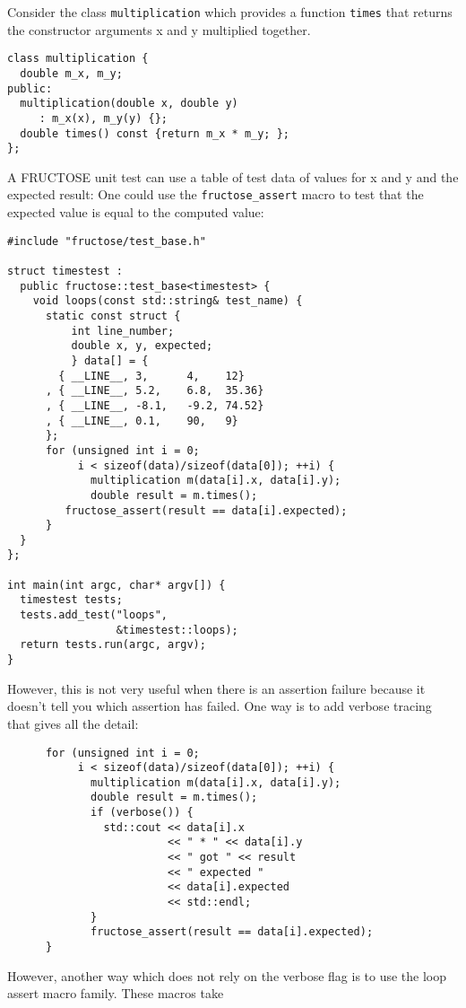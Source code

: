 \documentclass{book}
\begin{document}
Consider the class {\tt multiplication}
which provides a function {\tt times} that returns the constructor arguments
x and y multiplied together.
\begin{verbatim}
class multiplication {
  double m_x, m_y;
public:
  multiplication(double x, double y) 
     : m_x(x), m_y(y) {};
  double times() const {return m_x * m_y; };
};
\end{verbatim}
A FRUCTOSE unit test can use a table of test data of
values for x and y and the expected result:
One could use the {\tt fructose\_assert} macro to test
that the expected value is equal to the computed value:
\begin{verbatim}
#include "fructose/test_base.h"

struct timestest : 
  public fructose::test_base<timestest> {
    void loops(const std::string& test_name) {
      static const struct {
          int line_number;
          double x, y, expected;
          } data[] = {
        { __LINE__, 3,      4,    12}
      , { __LINE__, 5.2,    6.8,  35.36}
      , { __LINE__, -8.1,   -9.2, 74.52}
      , { __LINE__, 0.1,    90,   9}
      };
      for (unsigned int i = 0; 
           i < sizeof(data)/sizeof(data[0]); ++i) {
             multiplication m(data[i].x, data[i].y);
             double result = m.times();
         fructose_assert(result == data[i].expected);
      }
  }
};

int main(int argc, char* argv[]) {
  timestest tests;
  tests.add_test("loops", 
                 &timestest::loops);
  return tests.run(argc, argv);
}
\end{verbatim}
However, this is not very useful when there is an assertion failure
because it doesn't tell you which assertion has failed.
One way is to add verbose tracing that gives all the detail:
\begin{verbatim}
      for (unsigned int i = 0; 
           i < sizeof(data)/sizeof(data[0]); ++i) {
             multiplication m(data[i].x, data[i].y);
             double result = m.times();
             if (verbose()) {
               std::cout << data[i].x 
                         << " * " << data[i].y
                         << " got " << result 
                         << " expected " 
                         << data[i].expected 
                         << std::endl;
             }
             fructose_assert(result == data[i].expected);
      }
\end{verbatim}
However, another way which does not rely on the verbose flag
is to use the loop assert macro family. These macros take
\end{document}
